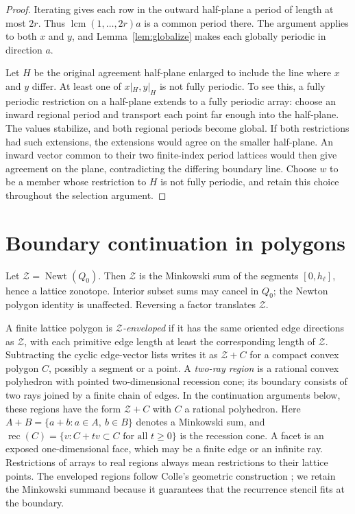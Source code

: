 \documentclass[11pt]{article}
\numberwithin{equation}{section}
\theoremstyle{definition}
\theoremstyle{remark}
\newcommand{\Newt}{\operatorname{Newt}}
\newcommand{\rec}{\operatorname{rec}}
\newcommand{\ZZ}{\mathcal Z}
\DeclareMathOperator{\lcm}{lcm}
\begin{document}
\begin{proof}
Iterating gives each row in the outward half-plane a period of length at most $2r$. Thus
$\lcm(1,\ldots,2r)a$ is a common period there. The argument applies to both $x$ and $y$, and
Lemma~\ref{lem:globalize} makes each globally periodic in direction $a$.

Let $H$ be the original agreement half-plane enlarged to include the line where $x$ and $y$ differ.
At least one of $x|_H,y|_H$ is not fully periodic. To see this, a fully periodic restriction on a
half-plane extends to a fully periodic array: choose an inward regional period and transport each
point far enough into the half-plane. The values stabilize, and both regional periods become global.
If both restrictions had such extensions, the extensions would agree on the smaller half-plane. An
inward vector common to their two finite-index period lattices would then give agreement on the
plane, contradicting the differing boundary line. Choose $w$ to be a member whose restriction to $H$
is not fully periodic, and retain this choice throughout the selection argument.
\end{proof}

\section{Boundary continuation in polygons}\label{sec:geometry}
Let $\ZZ=\Newt(Q_0)$. Then $\ZZ$ is the Minkowski sum of the segments $[0,h_\ell]$, hence a lattice
zonotope. Interior subset sums may cancel in $Q_0$; the Newton polygon identity is unaffected.
Reversing a factor translates $\ZZ$.

A finite lattice polygon is \emph{$\ZZ$-enveloped} if it has the same oriented edge directions as
$\ZZ$, with each primitive edge length at least the corresponding length of $\ZZ$. Subtracting the
cyclic edge-vector lists writes it as $\ZZ+C$ for a compact convex polygon $C$, possibly a segment
or a point. A \emph{two-ray region} is a rational convex polyhedron with pointed two-dimensional
recession cone; its boundary consists of two rays joined by a finite chain of edges. In the
continuation arguments below, these regions have the form $\ZZ+C$ with $C$ a rational polyhedron.
Here $A+B=\{a+b:a\in A,\ b\in B\}$ denotes a Minkowski sum, and
$\rec(C)=\{v:C+tv\subset C\text{ for all }t\ge0\}$ is the recession cone. A facet is an exposed
one-dimensional face, which may be a finite edge or an infinite ray. Restrictions of arrays to real
regions always mean restrictions to their lattice points. The enveloped regions follow Colle's
geometric construction \cite[Definition~3.3]{Colle}; we retain the Minkowski summand because
it guarantees that the recurrence stencil fits at the boundary.
\end{document}

